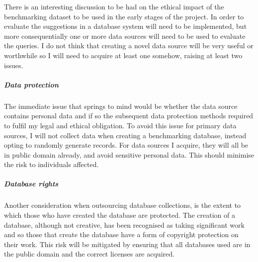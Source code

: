 There is an interesting discussion to be had on the ethical impact of the benchmarking dataset to be used in the early stages of the project. In order to evaluate the suggestions in \cite{RelationalAlgebraByWayOfAdjunctions} a database system will need to be implemented, but more consequentially one or more data sources will need to be used to evaluate the queries. I do not think that creating a novel data source will be very useful or worthwhile so I will need to acquire at least one somehow, raising at least two issues.
\subparagraph*{Data protection} The immediate issue that springs to mind would be whether the data source contains personal data and if so the subsequent data protection methods required to fulfil my legal and ethical obligation. To avoid this issue for primary data sources, I will not collect data when creating a benchmarking database, instead opting to randomly generate records. For data sources I acquire, they will all be in public domain already, and avoid sensitive personal data. This should minimise the risk to individuals affected.  
\subparagraph*{Database rights} Another consideration when outsourcing database collections, is the extent to which those who have created the database are protected. The creation of a database, although not creative, has been recognised as taking significant work and so those that create the database have a form of copyright protection on their work.  This risk will be mitigated by ensuring that all databases used are in the public domain and the correct licenses are acquired.

